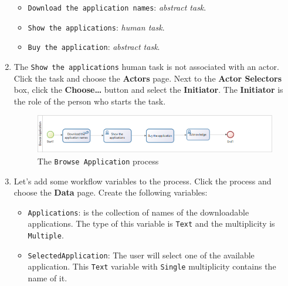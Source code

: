 \documentclass[]{report}
\let\Oldincludegraphics\includegraphics
\renewcommand{\includegraphics}[1]{
\begin{adjustbox}{max size={\textwidth}{\textheight}}
    \Oldincludegraphics[scale=0.6]{#1}%
\end{adjustbox}
}
\begin{document}
\begin{enumerate}
  \begin{itemize}
  \itemsep1pt\parskip0pt
  \item
    \texttt{Download the application names}: \emph{abstract task}.
  \item
    \texttt{Show the applications}: \emph{human task}.
  \item
    \texttt{Buy the application}: \emph{abstract task}.
  \end{itemize}
\item
  The \texttt{Show the applications} human task is not associated with
  an actor. Click the task and choose the \textbf{Actors} page. Next to
  the \textbf{Actor Selectors} box, click the \textbf{Choose\ldots{}}
  button and select the \textbf{Initiator}. The \textbf{Initiator} is
  the role of the person who starts the task.

  \begin{figure}[htbp]
  \centering
  \includegraphics{img/bpmn/bonita_browse_application_process.png}
  \caption{The \texttt{Browse Application} process}
  \end{figure}
\item
  Let's add some workflow variables to the process. Click the process
  and choose the \textbf{Data} page. Create the following variables:

  \begin{itemize}
  \itemsep1pt\parskip0pt
  \item
    \texttt{Applications}: is the collection of names of the
    downloadable applications. The type of this variable is
    \texttt{Text} and the multiplicity is \texttt{Multiple}.
  \item
    \texttt{SelectedApplication}: The user will select one of the
    available application. This \texttt{Text} variable with
    \texttt{Single} multiplicity contains the name of it.
  \end{itemize}


\end{enumerate}
\end{document}
